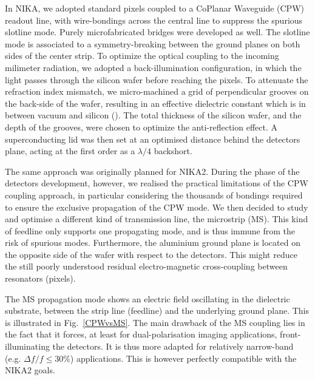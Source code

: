 \documentclass[]{aa} %
\begin{document}
In NIKA, we adopted standard pixels coupled to a CoPlanar Waveguide (CPW) readout line, with wire-bondings across the central line to suppress the spurious slotline mode. Purely microfabricated bridges were developed as well. The slotline mode is associated to a symmetry-breaking between the ground planes on both sides of the center strip. To optimize the optical coupling to the incoming milimeter radiation, we adopted a back-illumination configuration, in which the light passes through the silicon wafer before reaching the pixels. To attenuate the refraction index mismatch, we micro-machined a grid of perpendicular grooves on the back-side of the wafer, resulting in an effective dielectric constant which is in between vacuum and silicon (\cite{Goupy2016}). The total thickness of the silicon wafer, and the depth of the grooves, were chosen to optimize the anti-reflection effect. A superconducting lid was then set at an optimised distance behind the detectors plane, acting at the first order as a $\lambda/4$ backshort. 

The same approach was originally planned for NIKA2. During the phase of the detectors development, however, we realised the practical limitations of the CPW coupling approach, in particular considering the thousands of bondings required to ensure the exclusive propagation of the CPW mode. We then decided to study and optimise a different kind of transmission line, the microstrip (MS). This kind of feedline only supports one propagating mode, and is thus immune from the risk of spurious modes. Furthermore, the aluminium ground plane is located on the opposite side of the wafer with respect to the detectors. This might reduce the still poorly understood residual electro-magnetic cross-coupling between resonators (pixels).

The MS propagation mode shows an electric field oscillating in the dielectric substrate, between the strip line (feedline) and the underlying ground plane. This is illustrated in Fig.~\ref{CPWvsMS}. The main drawback of the MS coupling lies in the fact that it forces, at least for dual-polarisation imaging applications, front-illuminating the detectors. It is thus more adapted for relatively narrow-band (e.g. $\Delta f / f  \leq 30 \%$) applications. This is however perfectly compatible with the NIKA2 goals.  
\end{document}
